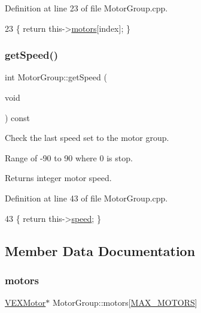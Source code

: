 Definition at line 23 of file Motor\+Group.\+cpp.


\begin{DoxyCode}
23 \{ \textcolor{keywordflow}{return} this->\hyperlink{class_motor_group_a8f2d6b4622a775ee0c5e95aafb83a1bb}{motors}[index]; \}
\end{DoxyCode}
\mbox{\label{class_motor_group_a163e2176272a1a65ddddcb81eb2bd132}} 
\subsubsection{\texorpdfstring{get\+Speed()}{getSpeed()}}
{\footnotesize\ttfamily int Motor\+Group\+::get\+Speed (\begin{DoxyParamCaption}\item[{void}]{ }\end{DoxyParamCaption}) const}



Check the last speed set to the motor group. 

Range of -\/90 to 90 where 0 is stop. \begin{DoxyReturn}{Returns}
integer motor speed. 
\end{DoxyReturn}


Definition at line 43 of file Motor\+Group.\+cpp.


\begin{DoxyCode}
43 \{ \textcolor{keywordflow}{return} this->\hyperlink{class_motor_group_a79ddfc90443f2f919d88f66e51494d97}{speed}; \}
\end{DoxyCode}


\subsection{Member Data Documentation}
\mbox{\label{class_motor_group_a8f2d6b4622a775ee0c5e95aafb83a1bb}} 
\subsubsection{\texorpdfstring{motors}{motors}}
{\footnotesize\ttfamily \hyperlink{class_v_e_x_motor}{V\+E\+X\+Motor}$\ast$ Motor\+Group\+::motors\mbox{[}\hyperlink{_motor_group_8hpp_a40dfd7fdfce455ce507bf3fed368c2ed}{M\+A\+X\+\_\+\+M\+O\+T\+O\+RS}\mbox{]}\hspace{0.3cm}{\ttfamily [private]}}



